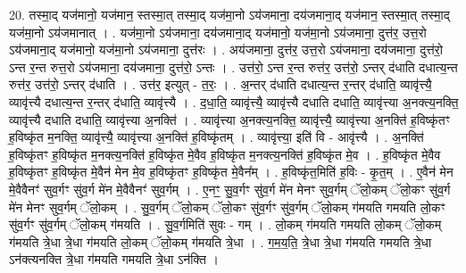 \documentclass[17pt]{extarticle}
\begin{document}
20. तस्मा॒द् यज॑मानो॒ यज॑मान॒ स्तस्मा॒त् तस्मा॒द् यज॑मा॒नो ऽय॑जमाना॒ दय॑जमाना॒द् यज॑मान॒ स्तस्मा॒त् तस्मा॒द् यज॑मा॒नो ऽय॑जमानात् । . यज॑मा॒नो ऽय॑जमाना॒ दय॑जमाना॒द् यज॑मानो॒ यज॑मा॒नो ऽय॑जमाना॒ दुत्त॑र॒ उत्त॒रो ऽय॑जमाना॒द् यज॑मानो॒ यज॑मा॒नो ऽय॑जमाना॒ दुत्त॑रः । . अय॑जमाना॒ दुत्त॑र॒ उत्त॒रो ऽय॑जमाना॒ दय॑जमाना॒ दुत्त॑रो॒ ऽन्त र॒न्त रुत्त॒रो ऽय॑जमाना॒ दय॑जमाना॒ दुत्त॑रो॒ ऽन्तः । . उत्त॑रो॒ ऽन्त र॒न्त रुत्त॑र॒ उत्त॑रो॒ ऽन्तर् द॑धाति दधात्य॒न्त रुत्त॑र॒ उत्त॑रो॒ ऽन्तर् द॑धाति । . उत्त॑र॒ इत्युत् - त॒रः॒ । . अ॒न्तर् द॑धाति दधात्य॒न्त र॒न्तर् द॑धाति॒ व्यावृ॑त्त्यै॒ व्यावृ॑त्त्यै दधात्य॒न्त र॒न्तर् द॑धाति॒ व्यावृ॑त्त्यै । . द॒धा॒ति॒ व्यावृ॑त्त्यै॒ व्यावृ॑त्त्यै दधाति दधाति॒ व्यावृ॑त्त्या अ॒नक्त्य॒नक्ति॒ व्यावृ॑त्त्यै दधाति दधाति॒ व्यावृ॑त्त्या अ॒नक्ति॑ । . व्यावृ॑त्त्या अ॒नक्त्य॒नक्ति॒ व्यावृ॑त्त्यै॒ व्यावृ॑त्त्या अ॒नक्ति॑ ह॒विष्कृ॑तꣳ ह॒विष्कृ॑त म॒नक्ति॒ व्यावृ॑त्त्यै॒ व्यावृ॑त्त्या अ॒नक्ति॑ ह॒विष्कृ॑तम् । . व्यावृ॑त्त्या॒ इति॑ वि - आवृ॑त्त्यै । . अ॒नक्ति॑ ह॒विष्कृ॑तꣳ ह॒विष्कृ॑त म॒नक्त्य॒नक्ति॑ ह॒विष्कृ॑त मे॒वैव ह॒विष्कृ॑त म॒नक्त्य॒नक्ति॑ ह॒विष्कृ॑त मे॒व । . ह॒विष्कृ॑त मे॒वैव ह॒विष्कृ॑तꣳ ह॒विष्कृ॑त मे॒वैन॑ मेन मे॒व ह॒विष्कृ॑तꣳ ह॒विष्कृ॑त मे॒वैन᳚म् । . ह॒विष्कृ॑त॒मिति॑ ह॒विः - कृ॒त॒म् । . ए॒वैन॑ मेन मे॒वैवैनꣳ॑ सुव॒र्गꣳ सु॑व॒र्ग मे॑न मे॒वैवैनꣳ॑ सुव॒र्गम् । . ए॒नꣳ॒॒ सु॒व॒र्गꣳ सु॑व॒र्ग मे॑न मेनꣳ सुव॒र्गम् ॅलो॒कम् ॅलो॒कꣳ सु॑व॒र्ग मे॑न मेनꣳ सुव॒र्गम् ॅलो॒कम् । . सु॒व॒र्गम् ॅलो॒कम् ॅलो॒कꣳ सु॑व॒र्गꣳ सु॑व॒र्गम् ॅलो॒कम् ग॑मयति गमयति लो॒कꣳ सु॑व॒र्गꣳ सु॑व॒र्गम् ॅलो॒कम् ग॑मयति । . सु॒व॒र्गमिति॑ सुवः - गम् । . लो॒कम् ग॑मयति गमयति लो॒कम् ॅलो॒कम् ग॑मयति त्रे॒धा त्रे॒धा ग॑मयति लो॒कम् ॅलो॒कम् ग॑मयति त्रे॒धा । . ग॒म॒य॒ति॒ त्रे॒धा त्रे॒धा ग॑मयति गमयति त्रे॒धा ऽन॑क्त्यनक्ति त्रे॒धा ग॑मयति गमयति त्रे॒धा ऽन॑क्ति । \newline
\end{document}
